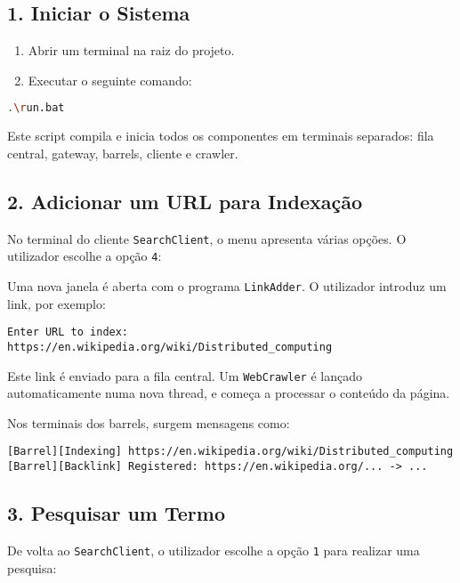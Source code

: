 \documentclass{article}
\begin{document}
\subsection*{1. Iniciar o Sistema}

\begin{enumerate}
    \item Abrir um terminal na raiz do projeto.
    \item Executar o seguinte comando:
\end{enumerate}

\begin{lstlisting}[language=bash]
.\run.bat
\end{lstlisting}

Este script compila e inicia todos os componentes em terminais separados: fila central, gateway, barrels, cliente e crawler.

\subsection*{2. Adicionar um URL para Indexação}

No terminal do cliente \texttt{SearchClient}, o menu apresenta várias opções. O utilizador escolhe a opção \texttt{4}:

Uma nova janela é aberta com o programa \texttt{LinkAdder}. O utilizador introduz um link, por exemplo:

\begin{lstlisting}
Enter URL to index: https://en.wikipedia.org/wiki/Distributed_computing
\end{lstlisting}

Este link é enviado para a fila central. Um \texttt{WebCrawler} é lançado automaticamente numa nova thread, e começa a processar o conteúdo da página.

Nos terminais dos barrels, surgem mensagens como:

\begin{lstlisting}
[Barrel][Indexing] https://en.wikipedia.org/wiki/Distributed_computing
[Barrel][Backlink] Registered: https://en.wikipedia.org/... -> ...
\end{lstlisting}

\subsection*{3. Pesquisar um Termo}

De volta ao \texttt{SearchClient}, o utilizador escolhe a opção \texttt{1} para realizar uma pesquisa:
\end{document}
